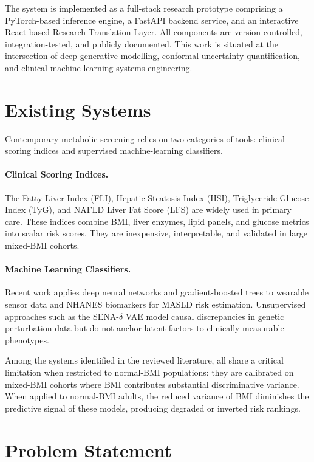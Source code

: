\documentclass[12pt,a4paper,oneside]{report}
\begin{document}
The system is implemented as a full-stack research prototype comprising a PyTorch-based inference engine, a FastAPI backend service, and an interactive React-based Research Translation Layer. All components are version-controlled, integration-tested, and publicly documented. This work is situated at the intersection of deep generative modelling, conformal uncertainty quantification, and clinical machine-learning systems engineering.

\section{Existing Systems}

Contemporary metabolic screening relies on two categories of tools: clinical scoring indices and supervised machine-learning classifiers.

\paragraph{Clinical Scoring Indices.} The Fatty Liver Index (FLI), Hepatic Steatosis Index (HSI), Triglyceride-Glucose Index (TyG), and NAFLD Liver Fat Score (LFS) are widely used in primary care. These indices combine BMI, liver enzymes, lipid panels, and glucose metrics into scalar risk scores. They are inexpensive, interpretable, and validated in large mixed-BMI cohorts.

\paragraph{Machine Learning Classifiers.} Recent work applies deep neural networks and gradient-boosted trees to wearable sensor data \citep{metwally2026} and NHANES biomarkers \citep{zhang2025,tertulino2025} for MASLD risk estimation. Unsupervised approaches such as the SENA-$\delta$ VAE \citep{shen2025} model causal discrepancies in genetic perturbation data but do not anchor latent factors to clinically measurable phenotypes.

Among the systems identified in the reviewed literature, all share a critical limitation when restricted to normal-BMI populations: they are calibrated on mixed-BMI cohorts where BMI contributes substantial discriminative variance. When applied to normal-BMI adults, the reduced variance of BMI diminishes the predictive signal of these models, producing degraded or inverted risk rankings.

\section{Problem Statement}
\end{document}
